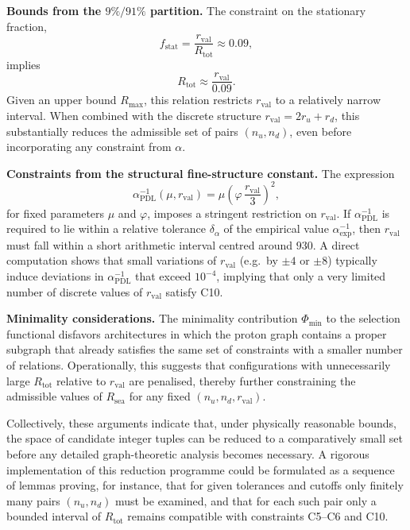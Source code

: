 \documentclass[11pt,a4paper]{article}
\begin{document}
\medskip
\noindent\textbf{Bounds from the $9\%/91\%$ partition.} The constraint on the stationary fraction,
\begin{equation}
f_{\mathrm{stat}} = \frac{r_{\mathrm{val}}}{R_{\mathrm{tot}}} \approx 0.09,
\end{equation}
implies
\begin{equation}
R_{\mathrm{tot}} \approx \frac{r_{\mathrm{val}}}{0.09}.
\end{equation}
Given an upper bound $R_{\max}$, this relation restricts $r_{\mathrm{val}}$ to a relatively narrow interval. When combined with the discrete structure $r_{\mathrm{val}} = 2r_u + r_d$, this substantially reduces the admissible set of pairs $(n_u,n_d)$, even before incorporating any constraint from $\alpha$.\cite{LaubscherPDLFull2026,LaubscherIMRadPDL2026}

\medskip
\noindent\textbf{Constraints from the structural fine-structure constant.} The expression
\begin{equation}
\alpha_{\mathrm{PDL}}^{-1}(\mu,r_{\mathrm{val}}) = \mu\left(\varphi\,\frac{r_{\mathrm{val}}}{3}\right)^{2},
\end{equation}
for fixed parameters $\mu$ and $\varphi$, imposes a stringent restriction on $r_{\mathrm{val}}$. If $\alpha_{\mathrm{PDL}}^{-1}$ is required to lie within a relative tolerance $\delta_{\alpha}$ of the empirical value $\alpha_{\mathrm{exp}}^{-1}$, then $r_{\mathrm{val}}$ must fall within a short arithmetic interval centred around $930$. A direct computation shows that small variations of $r_{\mathrm{val}}$ (e.g.\ by $\pm 4$ or $\pm 8$) typically induce deviations in $\alpha_{\mathrm{PDL}}^{-1}$ that exceed $10^{-4}$, implying that only a very limited number of discrete values of $r_{\mathrm{val}}$ satisfy C10.\cite{LaubscherDerivationAlpha2026}

\medskip
\noindent\textbf{Minimality considerations.} The minimality contribution $\Phi_{\mathrm{min}}$ to the selection functional disfavors architectures in which the proton graph contains a proper subgraph that already satisfies the same set of constraints with a smaller number of relations. Operationally, this suggests that configurations with unnecessarily large $R_{\mathrm{tot}}$ relative to $r_{\mathrm{val}}$ are penalised, thereby further constraining the admissible values of $R_{\mathrm{sea}}$ for any fixed $(n_u,n_d,r_{\mathrm{val}})$.\cite{LaubscherPDLFull2026}

Collectively, these arguments indicate that, under physically reasonable bounds, the space of candidate integer tuples can be reduced to a comparatively small set before any detailed graph-theoretic analysis becomes necessary. A rigorous implementation of this reduction programme could be formulated as a sequence of lemmas proving, for instance, that for given tolerances and cutoffs only finitely many pairs $(n_u,n_d)$ must be examined, and that for each such pair only a bounded interval of $R_{\mathrm{tot}}$ remains compatible with constraints C5–C6 and C10.
\end{document}
